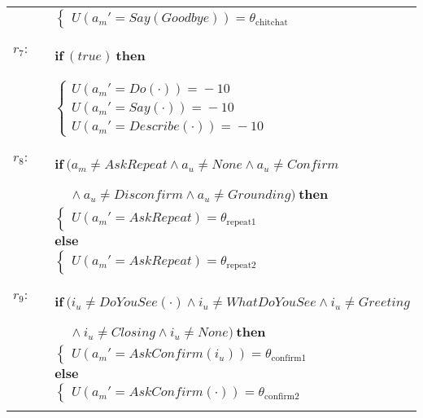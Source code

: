 \begin{footnotesize}
\begin{longtable}{p{2cm}l}
& \;\;\;\;\; $ \begin{cases}U(\mathit{a_m}'\!=\!\mathit{Say(Goodbye)})\!=\!\theta_{\mathrm{chitchat}} \end{cases}$ \\ \\[-1mm]
$r_{7}$: \ \ & $ \textbf{if} \  (\mathit{true}) \  \textbf{then}$ \\ & \;\;\;\;\; $\begin{cases}U(\mathit{a_m}'\!=\!\mathit{Do(\cdot)})\!=\!-10 \\
U(\mathit{a_m}'\!=\!\mathit{Say(\cdot)})\!=\!-10 \\
U(\mathit{a_m}'\!=\!\mathit{Describe(\cdot)})\!=\!-10 \end{cases}$ \\ \\[-1mm]
$r_{8}$: \ \ & $ \textbf{if} \ (\mathit{a_m}\!\neq\!\mathit{AskRepeat} \land \mathit{a_u}\!\neq\!\mathit{None} \land \mathit{a_u}\!\neq\!\mathit{Confirm} $ \\ & $\ \ \ \ \  \land \mathit{a_u}\!\neq\!\mathit{Disconfirm} \land \mathit{a_u}\!\neq\!\mathit{Grounding}) \ \textbf{then} $ \\
 & \;\;\;\;\; $ \begin{cases}U(\mathit{a_m}'\!=\!\mathit{AskRepeat})\!=\!\theta_{\mathrm{repeat1}} \end{cases}$ \vspace{1mm} \\ & $ \textbf{else}$ \\
& \;\;\;\;\; $ \begin{cases}U(\mathit{a_m}'\!=\!\mathit{AskRepeat})\!=\!\theta_{\mathrm{repeat2}} \end{cases}$ \\ \\[-1mm]
$r_{9}$: \ \ & $ \textbf{if} \ (\mathit{i_u}\!\neq\!\mathit{DoYouSee(\cdot)} \land \mathit{i_u}\!\neq\!\mathit{WhatDoYouSee} \land \mathit{i_u}\!\neq\!\mathit{Greeting} $ \\ & $\ \ \ \ \ \land \mathit{i_u}\!\neq\!\mathit{Closing} \land \mathit{i_u}\!\neq\!\mathit{None}) \ \textbf{then} $ \\
 & \;\;\;\;\; $ \begin{cases}U(\mathit{a_m}'\!=\!\mathit{AskConfirm({i_u})})\!=\!\theta_{\mathrm{confirm1}} \end{cases}$ \vspace{1mm} \\ & $ \textbf{else}$ \\
& \;\;\;\;\; $ \begin{cases}U(\mathit{a_m}'\!=\!\mathit{AskConfirm(\cdot)})\!=\!\theta_{\mathrm{confirm2}} \end{cases}$ \\ \\[-1mm]

\end{longtable}
\end{footnotesize}
